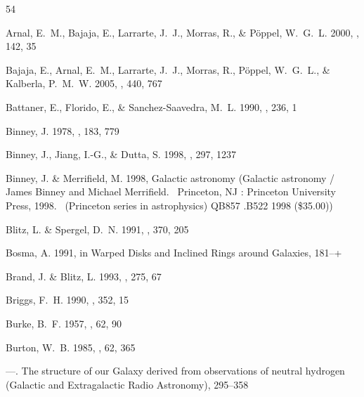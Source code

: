 \documentclass[apj]{emulateapj}
\begin{document}
%
%
\begin{thebibliography}{54}

{Arnal}, E.~M., {Bajaja}, E., {Larrarte}, J.~J., {Morras}, R., \& {P{\"o}ppel},
  W.~G.~L. 2000, \aaps, 142, 35

{Bajaja}, E., {Arnal}, E.~M., {Larrarte}, J.~J., {Morras}, R., {P{\"o}ppel},
  W.~G.~L., \& {Kalberla}, P.~M.~W. 2005, \aap, 440, 767

{Battaner}, E., {Florido}, E., \& {Sanchez-Saavedra}, M.~L. 1990, \aap, 236, 1

{Binney}, J. 1978, \mnras, 183, 779

{Binney}, J., {Jiang}, I.-G., \& {Dutta}, S. 1998, \mnras, 297, 1237

{Binney}, J. \& {Merrifield}, M. 1998, {Galactic astronomy} (Galactic astronomy
  / James Binney and Michael Merrifield.~ Princeton, NJ : Princeton University
  Press, 1998.~ (Princeton series in astrophysics) QB857 .B522 1998 (\$35.00))

{Blitz}, L. \& {Spergel}, D.~N. 1991, \apj, 370, 205

{Bosma}, A. 1991, in Warped Disks and Inclined Rings around Galaxies, 181--+

{Brand}, J. \& {Blitz}, L. 1993, \aap, 275, 67

{Briggs}, F.~H. 1990, \apj, 352, 15

{Burke}, B.~F. 1957, \aj, 62, 90

{Burton}, W.~B. 1985, \aaps, 62, 365

---. {The structure of our Galaxy derived from observations of neutral
  hydrogen} (Galactic and Extragalactic Radio Astronomy), 295--358


\end{thebibliography}
\end{document}
